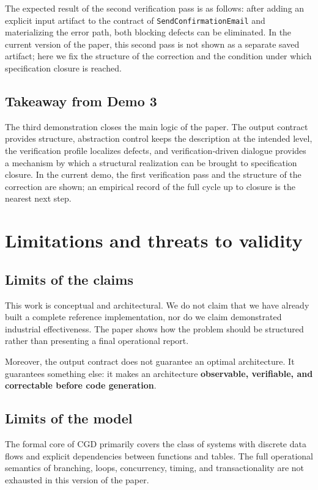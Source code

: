 \documentclass[12pt,a4paper]{article}
\begin{document}
The expected result of the second verification pass is as follows: after adding an explicit input artifact to the contract of \texttt{SendConfirmationEmail} and materializing the error path, both blocking defects can be eliminated. In the current version of the paper, this second pass is not shown as a separate saved artifact; here we fix the structure of the correction and the condition under which specification closure is reached.

\subsection{Takeaway from Demo 3}

The third demonstration closes the main logic of the paper. The output contract provides structure, abstraction control keeps the description at the intended level, the verification profile localizes defects, and verification-driven dialogue provides a mechanism by which a structural realization can be brought to specification closure. In the current demo, the first verification pass and the structure of the correction are shown; an empirical record of the full cycle up to closure is the nearest next step.

\section{Limitations and threats to validity}

\subsection{Limits of the claims}

This work is conceptual and architectural. We do not claim that we have already built a complete reference implementation, nor do we claim demonstrated industrial effectiveness. The paper shows how the problem should be structured rather than presenting a final operational report.

Moreover, the output contract does not guarantee an optimal architecture. It guarantees something else: it makes an architecture \textbf{observable, verifiable, and correctable before code generation}.

\subsection{Limits of the model}

The formal core of CGD primarily covers the class of systems with discrete data flows and explicit dependencies between functions and tables. The full operational semantics of branching, loops, concurrency, timing, and transactionality are not exhausted in this version of the paper.
\end{document}
